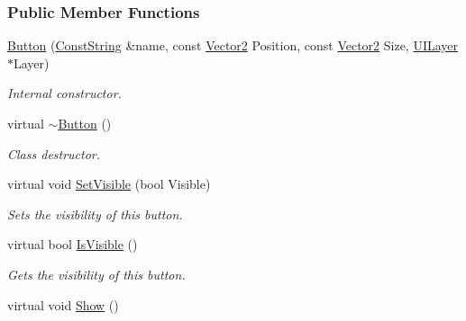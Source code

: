 \subsubsection*{Public Member Functions}
\begin{DoxyCompactItemize}
\item 
\hyperlink{classphys_1_1UI_1_1Button_a3a6c635f427093a5e4247611e3120948}{Button} (\hyperlink{namespacephys_a5ce5049f8b4bf88d6413c47b504ebb31}{ConstString} \&name, const \hyperlink{classphys_1_1Vector2}{Vector2} Position, const \hyperlink{classphys_1_1Vector2}{Vector2} Size, \hyperlink{classphys_1_1UILayer}{UILayer} $\ast$Layer)
\begin{DoxyCompactList}\small\item\em Internal constructor. \item\end{DoxyCompactList}\item 
\hypertarget{classphys_1_1UI_1_1Button_a80c8c92ae289e3161dde94bf1a5de59e}{
virtual \hyperlink{classphys_1_1UI_1_1Button_a80c8c92ae289e3161dde94bf1a5de59e}{$\sim$Button} ()}
\label{d8/d88/classphys_1_1UI_1_1Button_a80c8c92ae289e3161dde94bf1a5de59e}

\begin{DoxyCompactList}\small\item\em Class destructor. \item\end{DoxyCompactList}\item 
virtual void \hyperlink{classphys_1_1UI_1_1Button_a293a0a5296778fb3d638c31c5d9d4c75}{SetVisible} (bool Visible)
\begin{DoxyCompactList}\small\item\em Sets the visibility of this button. \item\end{DoxyCompactList}\item 
virtual bool \hyperlink{classphys_1_1UI_1_1Button_a2bca8ace690157fa2646bcf1cb54397a}{IsVisible} ()
\begin{DoxyCompactList}\small\item\em Gets the visibility of this button. \item\end{DoxyCompactList}\item 
\hypertarget{classphys_1_1UI_1_1Button_aad25b9ec4b9c7cc232d419dcd68f420e}{
virtual void \hyperlink{classphys_1_1UI_1_1Button_aad25b9ec4b9c7cc232d419dcd68f420e}{Show} ()}
\label{d8/d88/classphys_1_1UI_1_1Button_aad25b9ec4b9c7cc232d419dcd68f420e}


\end{DoxyCompactItemize}
